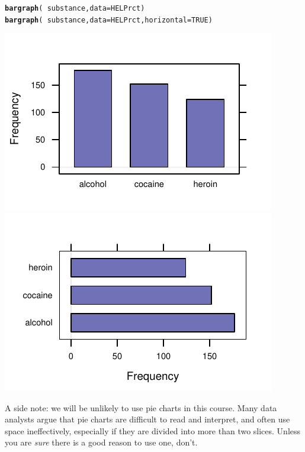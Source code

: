 \documentclass[twoside]{book}\usepackage[]{graphicx}\usepackage[]{xcolor}
\makeatletter
\def\maxwidth{ %
  \ifdim\Gin@nat@width>\linewidth
    \linewidth
  \else
    \Gin@nat@width
  \fi
}
\newcommand{\hlnum}[1]{\textcolor[rgb]{0.686,0.059,0.569}{#1}}%
\newcommand{\hlopt}[1]{\textcolor[rgb]{0,0,0}{#1}}%
\newcommand{\hlstd}[1]{\textcolor[rgb]{0.345,0.345,0.345}{#1}}%
\newcommand{\hlkwc}[1]{\textcolor[rgb]{0.333,0.667,0.333}{#1}}%
\newcommand{\hlkwd}[1]{\textcolor[rgb]{0.737,0.353,0.396}{\textbf{#1}}}%
\newenvironment{kframe}{%
 \def\at@end@of@kframe{}%
 \ifinner\ifhmode%
  \def\at@end@of@kframe{\end{minipage}}%
  \begin{minipage}{\columnwidth}%
 \fi\fi%
 \def\FrameCommand##1{\hskip\@totalleftmargin \hskip-\fboxsep
 \colorbox{shadecolor}{##1}\hskip-\fboxsep
     \hskip-\linewidth \hskip-\@totalleftmargin \hskip\columnwidth}%
 \MakeFramed {\advance\hsize-\width
   \@totalleftmargin\z@ \linewidth\hsize
   \@setminipage}}%
 {\par\unskip\endMakeFramed%
 \at@end@of@kframe}
\newenvironment{knitrout}{}{} %
\makeatother
\begin{document}
\begin{knitrout}
\color{fgcolor}\begin{kframe}
\begin{alltt}
\hlkwd{bargraph}\hlstd{(} \hlopt{~} \hlstd{substance,} \hlkwc{data}\hlstd{=HELPrct)}
\hlkwd{bargraph}\hlstd{(} \hlopt{~} \hlstd{substance,} \hlkwc{data}\hlstd{=HELPrct,} \hlkwc{horizontal}\hlstd{=}\hlnum{TRUE} \hlstd{)}
\end{alltt}
\end{kframe}

{\centering \includegraphics[width=\maxwidth]{figures/fig-bargraph-1} 
\includegraphics[width=\maxwidth]{figures/fig-bargraph-2} 

}



\end{knitrout}

A side note: we will be unlikely to use pie charts in this course.
Many data analysts argue that pie charts are difficult to read and interpret,
and often use space ineffectively, especially if they are divided into more than two slices.  Unless you are \textit{sure} 
there is a good reason to use one, don't.
\end{document}
